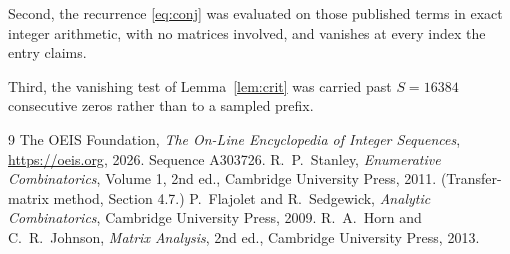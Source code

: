 \documentclass[11pt,a4paper]{article}
\theoremstyle{plain}
\theoremstyle{definition}
\begin{document}
Second, the recurrence \eqref{eq:conj} was evaluated on those published terms in exact
integer arithmetic, with no matrices involved, and vanishes at every index the entry claims.

Third, the vanishing test of Lemma~\ref{lem:crit} was carried past $S=16384$ consecutive
zeros rather than to a sampled prefix.

\begin{thebibliography}{9}
 The OEIS Foundation, \emph{The On-Line Encyclopedia of Integer
Sequences}, \url{https://oeis.org}, 2026. Sequence A303726.
 R.~P.~Stanley, \emph{Enumerative Combinatorics}, Volume 1, 2nd ed.,
Cambridge University Press, 2011. (Transfer-matrix method, Section 4.7.)
 P.~Flajolet and R.~Sedgewick, \emph{Analytic Combinatorics}, Cambridge
University Press, 2009.
 R.~A.~Horn and C.~R.~Johnson, \emph{Matrix Analysis}, 2nd ed., Cambridge
University Press, 2013.
\end{thebibliography}
\end{document}
